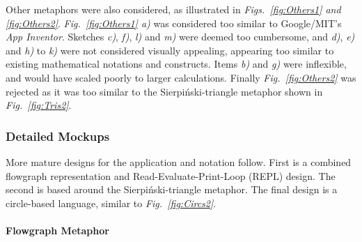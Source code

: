 \documentclass[12pt,twoside,notitlepage,xetex]{report}
\begin{document}
Other metaphors were also considered, as illustrated in \emph{Figs.~\ref{fig:Others1} and \ref{fig:Others2}}.  \emph{Fig.~\ref{fig:Others1} a)} was considered too similar to Google/MIT's \emph{App Inventor}.  Sketches \emph{c)}, \emph{f)}, \emph{l)} and \emph{m)} were deemed too cumbersome, and \emph{d)}, \emph{e)} and \emph{h)} to \emph{k)} were not considered visually appealing, appearing too similar to existing mathematical notations and constructs.  Items \emph{b)} and \emph{g)} were inflexible, and would have scaled poorly to larger calculations.  Finally \emph{Fig.~\ref{fig:Others2}} was rejected as it was too similar to the Sierpiński-triangle metaphor shown in \emph{Fig.~\ref{fig:Tris2}}.

\subsubsection{Detailed Mockups}

More mature designs for the application and notation follow.  First is a combined flowgraph representation and Read-Evaluate-Print-Loop (REPL) design.  The second is based around the Sierpiński-triangle metaphor.  The final design is a circle-based language, similar to \emph{Fig.~\ref{fig:Circs2}}.

\newpage
\paragraph{Flowgraph Metaphor}\hfill
\end{document}
